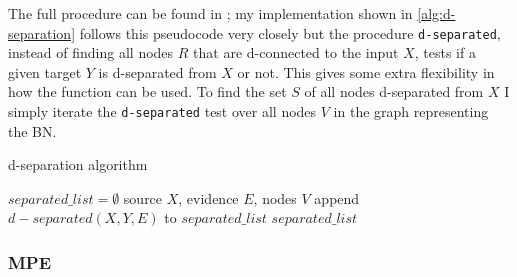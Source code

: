 The full procedure can be found in \cite{koller2007dseparation}; my implementation shown in \ref{alg:d-separation} follows this pseudocode very closely but the procedure \texttt{d-separated}, instead of finding all nodes $R$ that are d-connected to the input $X$, tests if a given target $Y$ is d-separated from $X$ or not.
This gives some extra flexibility in how the function can be used.
To find the set $S$ of all nodes d-separated from $X$ I simply iterate the \texttt{d-separated} test over all nodes $V$ in the graph representing the BN.

\begin{algorithm}[htp!]
	\caption{d-separation algorithm}
	\label{alg:d-separation}
	\begin{algorithmic}
		\STATE $separated\_list = \emptyset$
		 source $X$, evidence $E$, nodes $V$
		\STATE append $d-separated(X, Y, E)$ to $separated\_list$ 
		\ENDFOR
		 $separated\_list$
	\end{algorithmic}
\end{algorithm}

\subsubsection{MPE}


